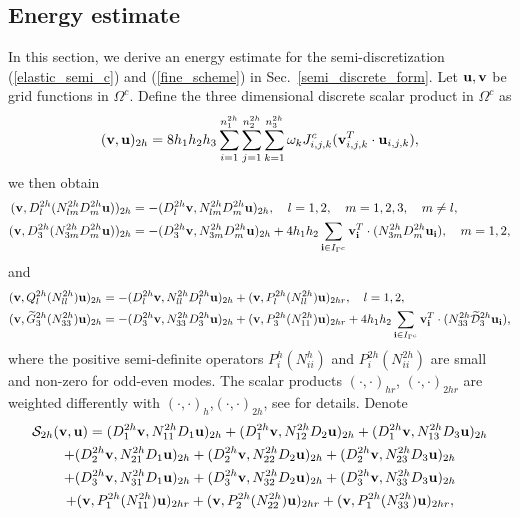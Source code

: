 \subsection{Energy estimate}\label{sec_energy}
In this section, we derive an energy estimate for the semi-discretization (\ref{elastic_semi_c}) and (\ref{fine_scheme}) in Sec.~\ref{semi_discrete_form}. Let ${\bf u}, {\bf v}$ be grid functions in $\Omega^c$. Define the three dimensional discrete scalar product in $\Omega^c$ as
\begin{equation}\label{scalar_product_inner}
({\bf v}, {\bf u})_{2h} = 8h_1h_2h_3\sum_{i=1}^{n_1^{2h}}\sum_{j=1}^{n_2^{2h}}\sum_{k=1}^{n_3^{2h}}\omega_k{J}_{i,j,k}^{c}({\bf v}_{i,j,k}^T\cdot {\bf u}_{i,j,k}),
\end{equation}
we then obtain
\begin{align}
({\bf v}, D_l^{2h}(N_{lm}^{2h}D_m^{2h}{\bf u}))_{2h} &= -(D_l^{2h}{\bf v},N_{lm}^{2h}D_m^{2h}{\bf u})_{2h}, \quad l = 1,2,\quad m = 1,2,3,\quad m\neq l,\label{ceq1}\\
({\bf v},D_3^{2h}(N_{3m}^{2h}D_m^{2h}{\bf u}))_{2h} &= -(D_3^{2h}{\bf v},N_{3m}^{2h}D_m^{2h}{\bf u})_{2h} + 4h_1h_2\sum_{{\bf i}\in I_{\Gamma^c}}{\bf v}_{\bf i}^T\cdot (N_{3m}^{2h}{D}_m^{2h}{\bf u}_{\bf i}), \quad m = 1,2,\label{ceq2}
\end{align}
and
\begin{align}
({\bf v},Q_l^{2h}(N_{ll}^{2h}){\bf u})_{2h} &= -(D_l^{2h}{\bf v},N_{ll}^{2h}D_l^{2h}{\bf u})_{2h} + ({\bf v},P_l^{2h}(N_{ll}^{2h}){\bf u})_{2hr},\quad l = 1,2,\label{ceq3}\\
({\bf v},\wt{G}_3^{2h}(N_{33}^{2h}){\bf u})_{2h} &= -(D_3^{2h}{\bf v},N_{33}^{2h}D_3^{2h}{\bf u})_{2h} + ({\bf v},P_3^{2h}(N_{11}^{2h}){\bf u})_{2hr} + 4h_1h_2\sum_{{\bf i}\in I_{\Gamma^c}}{\bf v}_{\bf i}^T\cdot (N_{33}^{2h}\wt{\mathcal{D}}_3^{2h}{\bf u}_{\bf i}),\label{ceq4}
\end{align}
where the positive semi-definite operators $P_i^{h}(N_{ii}^{h})$ and $P_i^{2h}(N_{ii}^{2h})$ are small and non-zero for odd-even modes. The scalar products $(\cdot, \cdot)_{hr}$, $(\cdot,\cdot)_{2hr}$ are weighted differently with $(\cdot, \cdot)_h$,$(\cdot, \cdot)_{2h}$, see \cite{petersson2015wave,sjogreen2012fourth} for details. Denote 
\begin{multline}\label{s2h}
\mathcal{S}_{2h}({\bf v},{\bf u}) = ({D}_1^{2h}{\bf v},{N}_{11}^{2h}{D}_1{\bf u})_{2h} +  ({D}_1^{2h}{\bf v},{N}_{12}^{2h}{D}_2{\bf u})_{2h} +  ({D}_1^{2h}{\bf v},{N}_{13}^{2h}{D}_3{\bf u})_{2h}\\
+  ({D}_2^{2h}{\bf v},{N}_{21}^{2h}{D}_1{\bf u})_{2h} 
+  ({D}_2^{2h}{\bf v},{N}_{22}^{2h}{D}_2{\bf u})_{2h} +  ({D}_2^{2h}{\bf v},{N}_{23}^{2h}{D}_3{\bf u})_{2h} \\
+  ({D}_3^{2h}{\bf v},{N}_{31}^{2h}{D}_1{\bf u})_{2h} 
+  ({D}_3^{2h}{\bf v},{N}_{32}^{2h}{D}_2{\bf u})_{2h} +  ({D}_3^{2h}{\bf v},{N}_{33}^{2h}{D}_3{\bf u})_{2h}\\
+ ({\bf v}, P^{2h}_1(N_{11}^{2h}){\bf u})_{2hr} + ({\bf v}, P^{2h}_2(N_{22}^{2h}){\bf u})_{2hr} + ({\bf v}, P^{2h}_1(N_{33}^{2h}){\bf u})_{2hr},
\end{multline}
